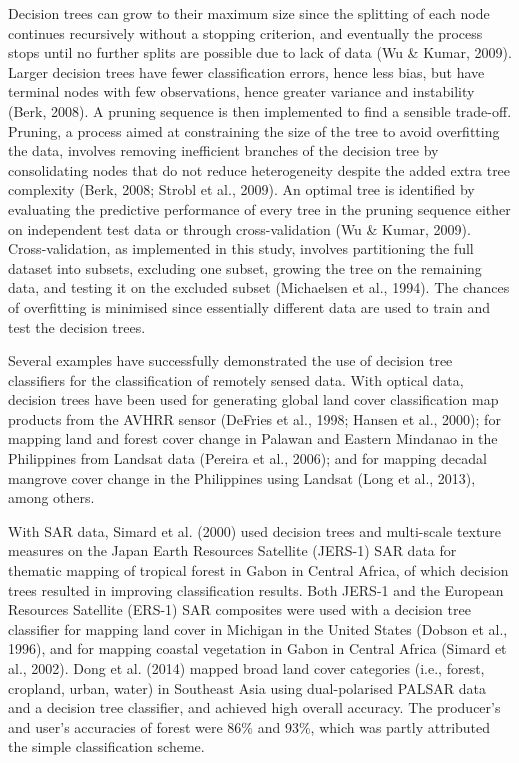 Decision trees can grow to their maximum size since the splitting of each node continues recursively without a stopping criterion, and eventually the process stops until no further splits are possible due to lack of data (Wu \& Kumar, 2009). Larger decision trees have fewer classification errors, hence less bias, but have terminal nodes with few observations, hence greater variance and instability (Berk, 2008). A pruning sequence is then implemented to find a sensible trade-off. Pruning, a process aimed at constraining the size of the tree to avoid overfitting the data, involves removing inefficient branches of the decision tree by consolidating nodes that do not reduce heterogeneity despite the added extra tree complexity (Berk, 2008; Strobl et al., 2009). An optimal tree is identified by evaluating the predictive performance of every tree in the pruning sequence either on independent test data or through cross-validation (Wu \& Kumar, 2009). Cross-validation, as implemented in this study, involves partitioning the full dataset into subsets, excluding one subset, growing the tree on the remaining data, and testing it on the excluded subset (Michaelsen et al., 1994). The chances of overfitting is minimised since essentially different data are used to train and test the decision trees.

Several examples have successfully demonstrated the use of decision tree classifiers for the classification of remotely sensed data. With optical data, decision trees have been used for generating global land cover classification map products from the AVHRR sensor (DeFries et al., 1998; Hansen et al., 2000); for mapping land and forest cover change in Palawan and Eastern Mindanao in the Philippines from Landsat data (Pereira et al., 2006); and for mapping decadal mangrove cover change in the Philippines using Landsat (Long et al., 2013), among others.

With SAR data, Simard et al. (2000) used decision trees and multi-scale texture measures on the Japan Earth Resources Satellite (JERS-1) SAR data for thematic mapping of tropical forest in Gabon in Central Africa, of which decision trees resulted in improving classification results. Both JERS-1 and the European Resources Satellite (ERS-1) SAR composites were used with a decision tree classifier for mapping land cover in Michigan in the United States (Dobson et al., 1996), and for mapping coastal vegetation in Gabon in Central Africa (Simard et al., 2002). Dong et al. (2014) mapped broad land cover categories (i.e., forest, cropland, urban, water) in Southeast Asia using dual-polarised PALSAR data and a decision tree classifier, and achieved high overall accuracy. The producer's and user's accuracies of forest were 86\% and 93\%, which was partly attributed the simple classification scheme.

